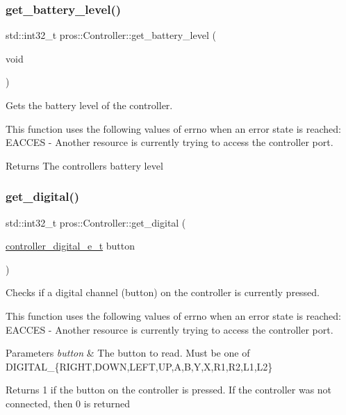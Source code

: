 \subsubsection{\texorpdfstring{get\+\_\+battery\+\_\+level()}{get\_battery\_level()}}
{\footnotesize\ttfamily std\+::int32\+\_\+t pros\+::\+Controller\+::get\+\_\+battery\+\_\+level (\begin{DoxyParamCaption}\item[{void}]{ }\end{DoxyParamCaption})}



Gets the battery level of the controller. 

This function uses the following values of errno when an error state is reached\+: E\+A\+C\+C\+ES -\/ Another resource is currently trying to access the controller port.

\begin{DoxyReturn}{Returns}
The controller\textquotesingle{}s battery level 
\end{DoxyReturn}
\mbox{\label{classpros_1_1Controller_aec180b0f1700915007de2b7855070c80}} 
\subsubsection{\texorpdfstring{get\+\_\+digital()}{get\_digital()}}
{\footnotesize\ttfamily std\+::int32\+\_\+t pros\+::\+Controller\+::get\+\_\+digital (\begin{DoxyParamCaption}\item[{\hyperlink{misc_8h_a8c380ff02828ee53954bc0ce274253ed}{controller\+\_\+digital\+\_\+e\+\_\+t}}]{button }\end{DoxyParamCaption})}



Checks if a digital channel (button) on the controller is currently pressed. 

This function uses the following values of errno when an error state is reached\+: E\+A\+C\+C\+ES -\/ Another resource is currently trying to access the controller port.


\begin{DoxyParams}{Parameters}
{\em button} & The button to read. Must be one of D\+I\+G\+I\+T\+A\+L\+\_\+\{R\+I\+G\+HT,D\+O\+WN,L\+E\+FT,UP,A,B,Y,X,R1,R2,L1,L2\}\\
\hline
\end{DoxyParams}
\begin{DoxyReturn}{Returns}
1 if the button on the controller is pressed. If the controller was not connected, then 0 is returned 
\end{DoxyReturn}
\mbox{\label{classpros_1_1Controller_a9dc7dc6028431d3f8f9aff0fc7a4bed6}} 
